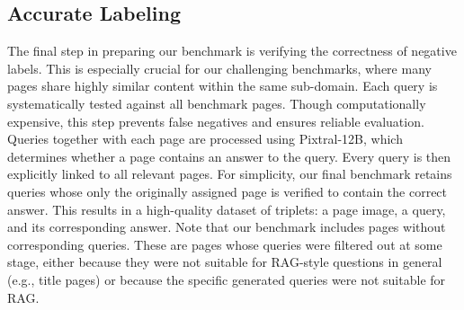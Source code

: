 \subsection{Accurate Labeling}

The final step in preparing our benchmark is verifying the correctness of negative labels.  This is especially crucial for our challenging benchmarks, where many pages share highly similar content within the same sub-domain.
Each query is systematically tested against all benchmark pages. Though computationally expensive, this step prevents false negatives and ensures reliable evaluation. Queries together with each page are processed using Pixtral-12B, which determines whether a page contains an answer to the query. Every query is then explicitly linked to all relevant pages. For simplicity, our final benchmark retains queries whose only the originally assigned page is verified to contain the correct answer. This results in a high-quality dataset of triplets: a page image, a query, and its corresponding answer. Note that our benchmark includes pages without corresponding queries. These are pages whose queries were filtered out at some stage, either because they were not suitable for RAG-style questions in general (e.g., title pages) or because the specific generated queries were not suitable for RAG.


